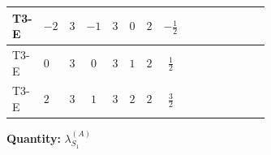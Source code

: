 \documentclass[8pt]{article}
\begin{document}
\begin{landscape}
\begin{longtable}{@{}llcccccc >{\raggedright\arraybackslash}p{0.21\linewidth} >{\raggedright\arraybackslash}p{0.21\linewidth} >{\raggedright\arraybackslash}p{0.21\linewidth}@{}}
\midrule
T3-E & $-2$ & $3$ & $-1$ & $3$ & $0$ & $2$ & $-\frac{1}{2}$ & \scriptsize\adjustbox{max width=\linewidth}{$\begin{gathered} +3 {\lambda_{HS_1}^{(A)}}^2\end{gathered}$} & \scriptsize\adjustbox{max width=\linewidth}{$\begin{gathered} +\frac{7 {\lambda_{S_1}^{(1)}}^2}{4}\end{gathered}$} & \scriptsize\adjustbox{max width=\linewidth}{$\begin{gathered} +22 {\lambda_{S_1}^{(A)}}^2\end{gathered}$} \\
\midrule
T3-E & $0$ & $3$ & $0$ & $3$ & $1$ & $2$ & $\frac{1}{2}$ & \scriptsize\adjustbox{max width=\linewidth}{$\begin{gathered} +3 {\lambda_{HS_1}^{(A)}}^2\end{gathered}$} & \scriptsize\adjustbox{max width=\linewidth}{$\begin{gathered} +\frac{7 {\lambda_{S_1}^{(1)}}^2}{4}\end{gathered}$} & \scriptsize\adjustbox{max width=\linewidth}{$\begin{gathered} +22 {\lambda_{S_1}^{(A)}}^2\end{gathered}$} \\
\midrule
T3-E & $2$ & $3$ & $1$ & $3$ & $2$ & $2$ & $\frac{3}{2}$ & \scriptsize\adjustbox{max width=\linewidth}{$\begin{gathered} +3 {\lambda_{HS_1}^{(A)}}^2\end{gathered}$} & \scriptsize\adjustbox{max width=\linewidth}{$\begin{gathered} +\frac{7 {\lambda_{S_1}^{(1)}}^2}{4}\end{gathered}$} & \scriptsize\adjustbox{max width=\linewidth}{$\begin{gathered} +22 {\lambda_{S_1}^{(A)}}^2\end{gathered}$} \\
\midrule
\bottomrule
\end{longtable}
\clearpage
\noindent\textbf{Quantity: }$\lambda_{S_1}^{(A)}$\par\smallskip

\end{landscape}
\end{document}
